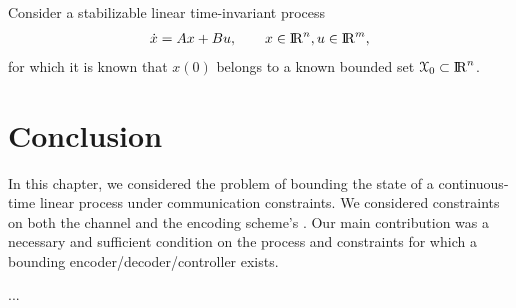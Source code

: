 Consider a stabilizable linear time-invariant process
\begin{align}\label{eq:full-process}
\dot x = A x + B u, \qquad x \in \mathrm{I\kern-.17em R}^n, u \in \mathrm{I\kern-.17em R}^m,
\end{align}
for which it is known that $x(0)$ belongs to a known bounded set
$\mathcal{X}_0 \subset \mathrm{I\kern-.17em R}^n$. 




\section{Conclusion}


In this chapter, we considered the problem of bounding the state of a continuous-time
linear process under communication constraints. We considered
constraints on both the channel \bitrate{} and the encoding scheme's \avecost{}.
Our main contribution was a necessary and sufficient
condition on the process and constraints for which a bounding
encoder/decoder/controller exists. 

...
